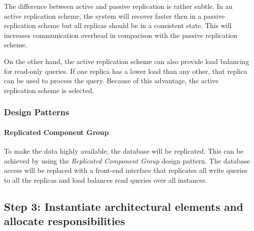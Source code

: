 \npar The difference between active and passive replication is rather subtle.
In an active replication scheme, the system will recover faster then in a
passive replication scheme but all replicas should be in a consistent
state. This will increases communication overhead in comparison with the
passive replication scheme.

\npar On the other hand, the active replication scheme can also provide load
balancing for read-only queries. If one replica has a lower load than any other,
that replica can be used to process the query. Because of this advantage, the
active replication scheme is selected.

\subsubsection{Design Patterns}
\label{add:it4/patterns}

\paragraph{Replicated Component Group} 

\npar To make the data highly available, the database will be replicated. This
can be achieved by using the \emph{Replicated Component Group} design pattern.
The database access will be replaced with a front-end interface that replicates
all write queries to all the replicas and load balances read queries over all
instances.

\subsection{Step 3: Instantiate architectural elements and allocate responsibilities}
\label{add:it4/elements}


